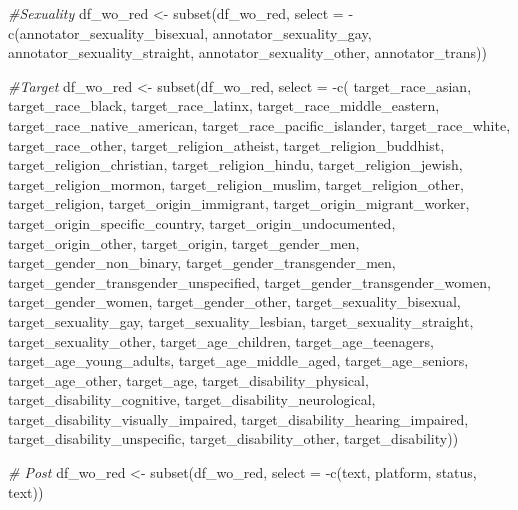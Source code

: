 \documentclass[
]{article}
\newenvironment{Shaded}{\begin{snugshade}}{\end{snugshade}}
\newcommand{\AttributeTok}[1]{\textcolor[rgb]{0.77,0.63,0.00}{#1}}
\newcommand{\CommentTok}[1]{\textcolor[rgb]{0.56,0.35,0.01}{\textit{#1}}}
\newcommand{\FunctionTok}[1]{\textcolor[rgb]{0.00,0.00,0.00}{#1}}
\newcommand{\NormalTok}[1]{#1}
\newcommand{\OtherTok}[1]{\textcolor[rgb]{0.56,0.35,0.01}{#1}}
\newcommand{\SpecialCharTok}[1]{\textcolor[rgb]{0.00,0.00,0.00}{#1}}
\begin{document}
\begin{Shaded}
\begin{Highlighting}[]
 \CommentTok{\#Sexuality}
\NormalTok{df\_wo\_red }\OtherTok{\textless{}{-}} \FunctionTok{subset}\NormalTok{(df\_wo\_red, }\AttributeTok{select =} \SpecialCharTok{{-}}\FunctionTok{c}\NormalTok{(annotator\_sexuality\_bisexual, annotator\_sexuality\_gay, annotator\_sexuality\_straight, annotator\_sexuality\_other, annotator\_trans))}

\CommentTok{\#Target}
\NormalTok{df\_wo\_red }\OtherTok{\textless{}{-}} \FunctionTok{subset}\NormalTok{(df\_wo\_red, }\AttributeTok{select =} \SpecialCharTok{{-}}\FunctionTok{c}\NormalTok{( target\_race\_asian, target\_race\_black,}
\NormalTok{target\_race\_latinx, target\_race\_middle\_eastern, target\_race\_native\_american,}
\NormalTok{target\_race\_pacific\_islander, target\_race\_white, target\_race\_other, target\_religion\_atheist, target\_religion\_buddhist,}
\NormalTok{target\_religion\_christian, target\_religion\_hindu, target\_religion\_jewish,}
\NormalTok{target\_religion\_mormon, target\_religion\_muslim, target\_religion\_other,}
\NormalTok{target\_religion, target\_origin\_immigrant, target\_origin\_migrant\_worker,}
\NormalTok{target\_origin\_specific\_country, target\_origin\_undocumented, target\_origin\_other,}
\NormalTok{target\_origin, target\_gender\_men, target\_gender\_non\_binary,}
\NormalTok{target\_gender\_transgender\_men, target\_gender\_transgender\_unspecified, target\_gender\_transgender\_women,}
\NormalTok{target\_gender\_women, target\_gender\_other,}
\NormalTok{target\_sexuality\_bisexual, target\_sexuality\_gay, target\_sexuality\_lesbian,}
\NormalTok{target\_sexuality\_straight, target\_sexuality\_other,}
\NormalTok{target\_age\_children, target\_age\_teenagers, target\_age\_young\_adults,}
\NormalTok{target\_age\_middle\_aged, target\_age\_seniors, target\_age\_other,}
\NormalTok{target\_age, target\_disability\_physical, target\_disability\_cognitive,}
\NormalTok{target\_disability\_neurological, target\_disability\_visually\_impaired, target\_disability\_hearing\_impaired,}
\NormalTok{target\_disability\_unspecific, target\_disability\_other, target\_disability))}

\CommentTok{\# Post}
\NormalTok{df\_wo\_red }\OtherTok{\textless{}{-}} \FunctionTok{subset}\NormalTok{(df\_wo\_red, }\AttributeTok{select =} \SpecialCharTok{{-}}\FunctionTok{c}\NormalTok{(text, platform, status, text))}


\end{Highlighting}
\end{Shaded}
\end{document}
